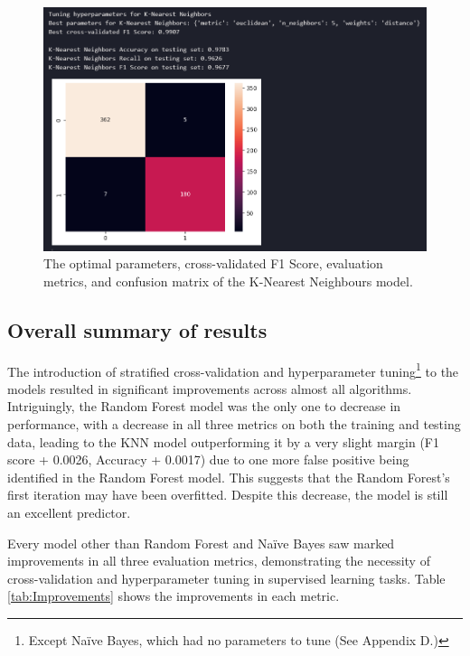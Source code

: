 \documentclass[12pt]{report}
\newcommand{\para}{\vspace{8pt}\noindent}
\begin{document}
\begin{figure}[H]
    \centering
    \includegraphics[width=\linewidth]{ModelDev/Iteration2/Results/KNN.png}
    \caption{The optimal parameters, cross-validated F1 Score, evaluation metrics, and confusion matrix of the K-Nearest Neighbours model.}
    \label{fig:KNNIteration2}
\end{figure}

\subsection{Overall summary of results}
The introduction of stratified cross-validation and hyperparameter tuning\footnote{Except Na\"ive Bayes, which had no parameters to tune (See Appendix D.)} to the models
resulted in significant improvements across almost all algorithms. Intriguingly, the Random Forest model was the only one to decrease in performance, with a decrease in 
all three metrics on both the training and testing data, leading to the KNN model outperforming it by a very slight margin (F1 score + 0.0026, Accuracy + 0.0017)
due to one more false positive being identified in the Random Forest model. This suggests that the Random Forest's first iteration may have been overfitted. Despite 
this decrease, the model is still an excellent predictor.

\para Every model other than Random Forest and Na\"ive Bayes saw marked improvements in all three evaluation metrics, demonstrating the necessity of cross-validation 
and hyperparameter tuning in supervised learning tasks. Table \ref{tab:Improvements} shows the improvements in each metric.
\end{document}
